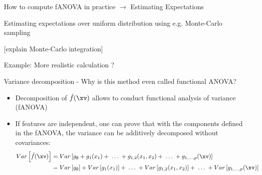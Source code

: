 \documentclass[11pt,compress,t,notes=noshow, aspectratio=169, xcolor=table]{beamer}
\newcommand{\open}{}
\newcommand{\close}{}
\begin{document}
\begin{frame}{How to compute fANOVA in practice $\rightarrow$ Estimating Expectations}

    Estimating expectations over uniform distribution using e.g. Monte-Carlo sampling

    [explain Monte-Carlo integration]
    
\end{frame}

\begin{frame}{Example: More realistic calculation ?}
    
\end{frame}

\begin{frame}{Variance decomposition - Why is this method even called functional ANOVA?}

\begin{itemize}[<+->]
\item Decomposition of $\hat{f}(\xv)$ allows to conduct functional analysis of variance (fANOVA)
\item If features are independent, one can prove that with the components defined in the fANOVA, the variance can be additively decomposed without covariances:
 \begin{align*}Var\left[\hat{f}(\xv)\right] &=  Var\left[g_{\open \emptyset \close} + g_{\open 1 \close}(x_1) + \;\dots\; + g_{\open 1, 2 \close}(x_1, x_2) + \;\dots\; + g_{\open 1,\ldots,p \close}(\xv) \right] \\
&= Var\left[g_{\open \emptyset \close}\right] + Var\left[g_{\open 1 \close}(x_1)\right] + \;\dots\; + Var\left[g_{\open 1, 2 \close}(x_1, x_2)\right] + \;\dots\; + Var\left[g_{\open 1,\ldots,p \close}(\xv)\right]\end{align*}


\end{itemize}
\end{frame}
\end{document}
